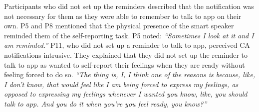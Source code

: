          
        Participants who did not set up the reminders described that the notification was not necessary for them as they were able to remember to talk to \acl{app} on their own. 
        P5 and P8 mentioned that the physical presence of the smart speaker reminded them of the self-reporting task. P5 noted: 
                \textit{``Sometimes I look at it and I am reminded.''}
        P11,  who did not set up a reminder to talk to \acl{app}, perceived \ac{CA} notifications intrusive. They explained that they did not set up the reminder to talk to \acl{app} as wanted to self-report their feelings when they are ready without feeling forced to do so.
                \textit{``The thing is, I, I think one of the reasons is because, like, I don't know, that would feel like I am being forced to express my feelings, as opposed to expressing my feelings whenever I wanted you know, like, you should talk to \acl{app}. And you do it when you're you feel ready, you know?''}

